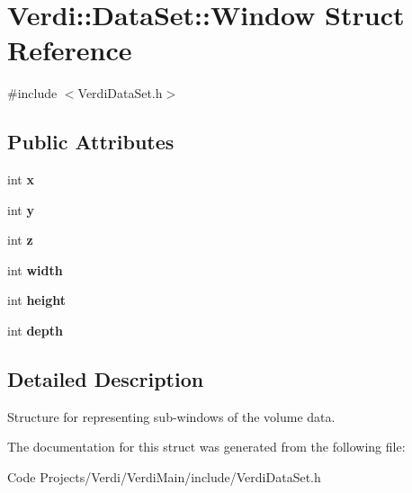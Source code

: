 \hypertarget{struct_verdi_1_1_data_set_1_1_window}{\section{\-Verdi\-:\-:\-Data\-Set\-:\-:\-Window \-Struct \-Reference}
\label{struct_verdi_1_1_data_set_1_1_window}
}


{\ttfamily \#include $<$\-Verdi\-Data\-Set.\-h$>$}

\subsection*{\-Public \-Attributes}
\begin{DoxyCompactItemize}
\item 
\hypertarget{struct_verdi_1_1_data_set_1_1_window_adb1780dddd8a88d3ee855a9f6d6a1472}{int {\bfseries x}}\label{struct_verdi_1_1_data_set_1_1_window_adb1780dddd8a88d3ee855a9f6d6a1472}

\item 
\hypertarget{struct_verdi_1_1_data_set_1_1_window_a636d6966cd29547e970f13549cbe6b21}{int {\bfseries y}}\label{struct_verdi_1_1_data_set_1_1_window_a636d6966cd29547e970f13549cbe6b21}

\item 
\hypertarget{struct_verdi_1_1_data_set_1_1_window_ab6a76f17cbd9de94d3f8f5203b61dfdd}{int {\bfseries z}}\label{struct_verdi_1_1_data_set_1_1_window_ab6a76f17cbd9de94d3f8f5203b61dfdd}

\item 
\hypertarget{struct_verdi_1_1_data_set_1_1_window_a698efadff319257e2052058217c2fbe1}{int {\bfseries width}}\label{struct_verdi_1_1_data_set_1_1_window_a698efadff319257e2052058217c2fbe1}

\item 
\hypertarget{struct_verdi_1_1_data_set_1_1_window_a3399ecb7bf09580f09ab1c7d80002290}{int {\bfseries height}}\label{struct_verdi_1_1_data_set_1_1_window_a3399ecb7bf09580f09ab1c7d80002290}

\item 
\hypertarget{struct_verdi_1_1_data_set_1_1_window_aef609866f1944b63c651dc49c4c6894e}{int {\bfseries depth}}\label{struct_verdi_1_1_data_set_1_1_window_aef609866f1944b63c651dc49c4c6894e}

\end{DoxyCompactItemize}


\subsection{\-Detailed \-Description}
\-Structure for representing sub-\/windows of the volume data. 

\-The documentation for this struct was generated from the following file\-:\begin{DoxyCompactItemize}
\item 
\-Code Projects/\-Verdi/\-Verdi\-Main/include/\-Verdi\-Data\-Set.\-h\end{DoxyCompactItemize}
